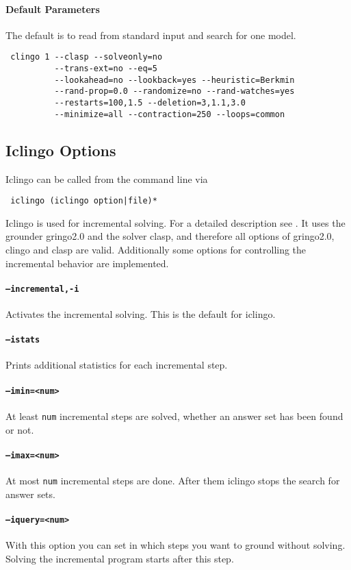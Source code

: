 \documentclass[a4paper,10pt]{article}
\begin{document}
\paragraph{Default Parameters}
The default is to read from standard input and search for one model.
\begin{verbatim}
 clingo 1 --clasp --solveonly=no
          --trans-ext=no --eq=5 
          --lookahead=no --lookback=yes --heuristic=Berkmin
          --rand-prop=0.0 --randomize=no --rand-watches=yes
          --restarts=100,1.5 --deletion=3,1.1,3.0
          --minimize=all --contraction=250 --loops=common
\end{verbatim}

\subsection{Iclingo Options}
Iclingo can be called from the command line via
\begin{verbatim}
 iclingo (iclingo option|file)*
\end{verbatim}
Iclingo is used for incremental solving. For a detailed description see \cite{gekaosscth08a}.
It uses the grounder gringo2.0 and the solver clasp, and therefore all options of gringo2.0, clingo and clasp are valid.
Additionally some options for controlling the incremental behavior are implemented.
\paragraph{\texttt{--incremental,-i}}
Activates the incremental solving. This is the default for iclingo.
\paragraph{\texttt{--istats}}
Prints additional statistics for each incremental step.
\paragraph{\texttt{--imin=<num>}}
At least \texttt{num} incremental steps are solved, whether an answer set has been found or not.
\paragraph{\texttt{--imax=<num>}}
At most \texttt{num} incremental steps are done. After them iclingo stops the search for answer sets.
\paragraph{\texttt{--iquery=<num>}}
With this option you can set in which steps you want to ground without solving.
Solving the incremental program starts after this step.
\end{document}
